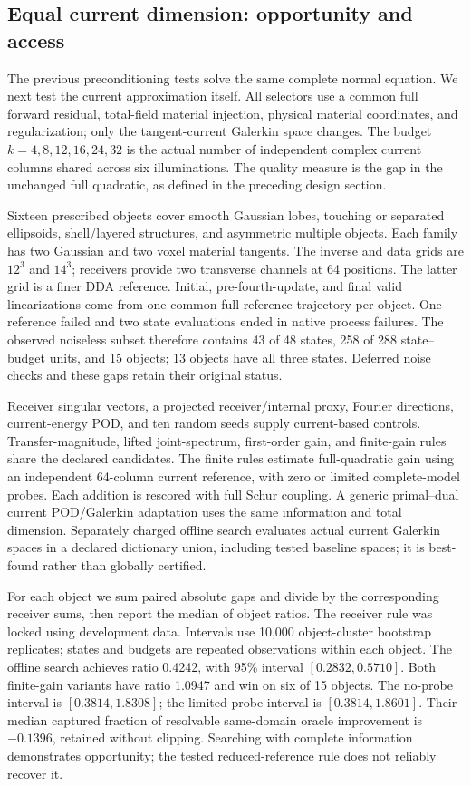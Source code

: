 \subsection{Equal current dimension: opportunity and access}
The previous preconditioning tests solve the same complete normal equation. We next test the current approximation itself. All selectors use a common full forward residual, total-field material injection, physical material coordinates, and regularization; only the tangent-current Galerkin space changes. The budget $k=4,8,12,16,24,32$ is the actual number of independent complex current columns shared across six illuminations. The quality measure is the gap in the unchanged full quadratic, as defined in the preceding design section.

Sixteen prescribed objects cover smooth Gaussian lobes, touching or separated ellipsoids, shell/layered structures, and asymmetric multiple objects. Each family has two Gaussian and two voxel material tangents. The inverse and data grids are $12^3$ and $14^3$; receivers provide two transverse channels at 64 positions. The latter grid is a finer DDA reference. Initial, pre-fourth-update, and final valid linearizations come from one common full-reference trajectory per object. One reference failed and two state evaluations ended in native process failures. The observed noiseless subset therefore contains 43 of 48 states, 258 of 288 state--budget units, and 15 objects; 13 objects have all three states. Deferred noise checks and these gaps retain their original status.

Receiver singular vectors, a projected receiver/internal proxy, Fourier directions, current-energy POD, and ten random seeds supply current-based controls. Transfer-magnitude, lifted joint-spectrum, first-order gain, and finite-gain rules share the declared candidates. The finite rules estimate full-quadratic gain using an independent 64-column current reference, with zero or limited complete-model probes. Each addition is rescored with full Schur coupling. A generic primal--dual current POD/Galerkin adaptation uses the same information and total dimension. Separately charged offline search evaluates actual current Galerkin spaces in a declared dictionary union, including tested baseline spaces; it is best-found rather than globally certified.

For each object we sum paired absolute gaps and divide by the corresponding receiver sums, then report the median of object ratios. The receiver rule was locked using development data. Intervals use 10,000 object-cluster bootstrap replicates; states and budgets are repeated observations within each object. The offline search achieves ratio 0.4242, with 95\% interval $[0.2832,0.5710]$. Both finite-gain variants have ratio 1.0947 and win on six of 15 objects. The no-probe interval is $[0.3814,1.8308]$; the limited-probe interval is $[0.3814,1.8601]$. Their median captured fraction of resolvable same-domain oracle improvement is $-0.1396$, retained without clipping. Searching with complete information demonstrates opportunity; the tested reduced-reference rule does not reliably recover it.

